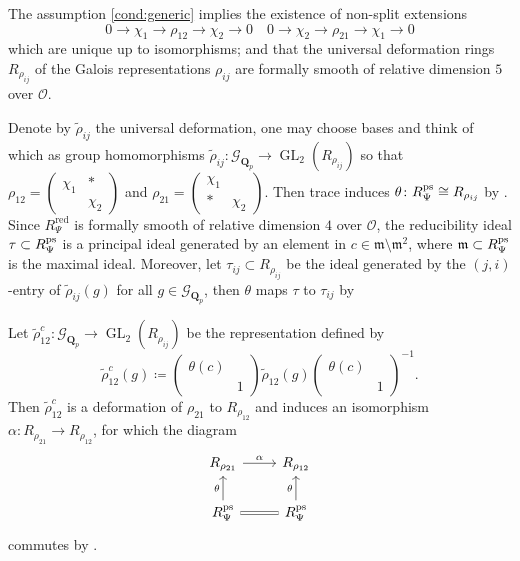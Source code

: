 \documentclass[leqno]{amsart}
\newcommand{\smat}[1]{\left( \begin{smallmatrix} #1 \end{smallmatrix} \right)}
\newcommand{\Gp}{\mathcal{G}_{\Qp}} %
\newcommand{\ps}{\textnormal{ps}}
\DeclareMathOperator{\red}{red}
\DeclareMathOperator{\GL}{GL}
\newcommand{\Qp}{\mathbf{Q}_p}
\newcommand{\oo}{\mathcal O}
\newcommand{\1}{\mathbf{1}}
\newcommand{\fm}{\mathfrak m}
\theoremstyle{definition}
\theoremstyle{remark}
\begin{document}
The assumption \eqref{cond:generic}
implies the existence of non-split extensions
\begin{equation*}
    0\to \chi_1\to \rho_{12}\to \chi_2\to 0\quad
    0\to \chi_2\to \rho_{21}\to \chi_1\to 0
\end{equation*}
which are unique up to isomorphisms;
and that the universal deformation rings
$R_{\rho_{ij}}$ of the Galois representations $\rho_{ij}$
are formally smooth of relative dimension $5$ over $\oo$.

Denote by $\tilde{\rho}_{ij}$ the universal deformation,
one may choose bases and think of which as group homomorphisms
$\tilde{\rho}_{ij}\colon \Gp\to \GL_2(R_{\rho_{ij}})$
so that 
$\rho_{12}=\smat{\chi_1&*\\&\chi_2}$ and
$\rho_{21}=\smat{\chi_1&\\ * &\chi_2}$.
Then trace induces $\theta\colon R_{\Psi}^{\ps}\cong R_{\rho_{ij}}$ by \cite[Prop B.17]{pask}.
Since $R^{\red}_{\Psi}$ is formally smooth of relative dimension $4$ over $\oo$,
the reducibility ideal  $\tau\subset R_{\Psi}^{\ps}$ is a principal ideal generated by 
an element in $c\in\fm\setminus \fm^2$,
where $\fm\subset R_{\Psi}^{\ps}$ is the maximal ideal. 
Moreover, let $\tau_{ij}\subset R_{\rho_{ij}} $ be the ideal 
generated by the $(j,i)$-entry of  $ \tilde{\rho}_{ij}(g)$
for all $g\in \Gp$,
then  $\theta$ maps  $\tau$ to  $\tau_{ij}$ by \cite[Prop B.23]{pask}

Let $\tilde{\rho}_{12}^c\colon \Gp\to \GL_2(R_{\rho_{ij}})$ be the representation defined by
\begin{equation*}
	\tilde{\rho}_{12}^c(g)\coloneqq 
	\smat{\theta(c)&\\&1}
	\tilde{\rho}_{12}(g)
	\smat{\theta(c)&\\&1}^{-1}.
\end{equation*}
Then $ \tilde{\rho}_{12}^c$ is a deformation of $\rho_{21}$ to $R_{\rho_{12}}$
and induces an isomorphism $\alpha\colon R_{\rho_{21}}\to R_{\rho_{12}}$,
for which the diagram
\begin{equation*}
	\begin{tikzcd}
		R_{\rho_{21}} \arrow[r,"\alpha"] &
		R_{\rho_{12}}\\
		R_{\Psi}^{\ps} \arrow[u,"\theta"] \arrow[r,equal] &
		R_{\Psi}^{\ps} \arrow[u,"\theta"]
	\end{tikzcd}
\end{equation*}
commutes by \cite[Prop B.24]{pask}.
\end{document}
